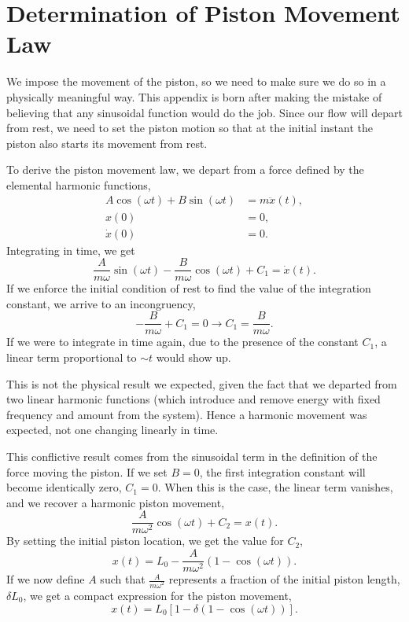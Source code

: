 \documentclass[../../thesis.tex]{subfiles}
\begin{document}
\section{Determination of Piston Movement Law}
\label{sec:appendix_piston_movement_law}
We impose the movement of the piston, 
so we need to make sure we do so in a physically meaningful way.
This appendix is born after making the mistake 
of believing that any sinusoidal function would do the job.
Since our flow will depart from rest, 
we need to set the piston motion 
so that at the initial instant the piston also
starts its movement from rest.

To derive the piston movement law, 
we depart from a force defined by the elemental harmonic functions,
\begin{subequations}
\begin{align}
        A \cos(\omega t) + B \sin(\omega t) &= m \ddot{x}(t), 
        \\
        x(0) &= 0, 
        \\
        \dot{x}(0) &= 0.
\end{align}
\end{subequations}
Integrating in time, we get
\begin{equation}
    \frac{A}{m \omega} \sin(\omega t) - \frac{B}{m \omega} \cos(\omega t) + C_1 = \dot{x}(t).
\end{equation}
If we enforce the initial condition of rest to find the value of the integration constant, 
we arrive to an incongruency,
\begin{equation}
    - \frac{B}{m \omega} + C_1 = 0 \rightarrow C_1 = \frac{B}{m \omega}.
\end{equation}
If we were to integrate in time again, 
due to the presence of the constant $C_1$, 
a linear term proportional to $\sim t$ would show up.

This is not the physical result we expected, 
given the fact that we departed from two linear harmonic functions
(which introduce and remove energy with fixed frequency and amount from the system). 
Hence a harmonic movement was expected, not one changing linearly in time.

This conflictive result comes from 
the sinusoidal term in the definition of the force moving the piston.
If we set $B=0$, the first integration constant will become identically zero, $C_1=0$. 
When this is the case, the linear term vanishes, and we recover a harmonic piston movement,
\begin{equation}
    \frac{A}{m \omega^2} \cos(\omega t) + C_2 = x(t).
\end{equation}
By setting the initial piston location, we get the value for $C_2$,
\begin{equation}
    x(t) = L_0 - \frac{A}{m \omega^2} \left(1 - \cos(\omega t)\right).
\end{equation}
If we now define $A$ such that $\frac{A}{m \omega^2}$ represents a fraction of the initial piston length, $\delta L_0$, 
we get a compact expression for the piston movement,
\begin{equation}
    x(t) = L_0\left[1 - \delta \left(1 - \cos(\omega t)\right)\right].
\end{equation}
\end{document}
